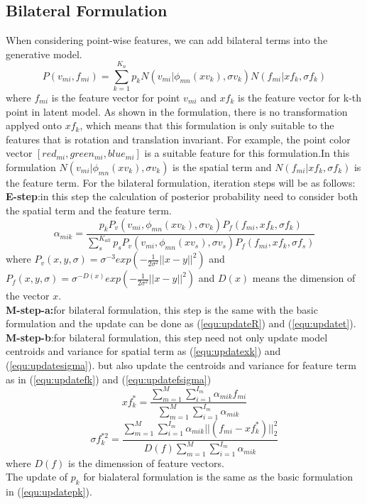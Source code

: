 \subsection{Bilateral Formulation}
When considering point-wise features, we can add bilateral terms into the generative model.
\begin{equation}
P(v_{mi},f_{mi})=\sum^{K_n}_{k=1}p_kN(v_{mi}|\phi_{mn}(xv_k),\sigma v_k)N(f_{mi}|xf_k,\sigma f_k)
\end{equation}
where $f_{mi}$ is the feature vector for point $v_{mi}$ and $xf_k$ is the feature vector for k-th point in latent model. As shown in the formulation, there is no transformation applyed onto $xf_k$, which means that this formulation is only suitable to the features that is rotation and translation invariant. For example, the point color vector $[red_{mi},green_{mi},blue_{mi}]$ is a suitable feature for this formulation.In this formulation $N(v_{mi}|\phi_{mn}(xv_k),\sigma v_k)$ is the spatial term and $N(f_{mi}|xf_k,\sigma f_k)$ is the feature term.
For the bilateral formulation, iteration steps will be as follows:\\
\textbf{E-step}:in this step the calculation of posterior probability need to consider both the spatial term and the feature term.
\begin{equation}
\label{equ:bestep}
\alpha_{mik}=\frac{p_kP_v(v_{mi},\phi_{mn}(xv_k),\sigma v_k)P_f(f_{mi},xf_k,\sigma f_k)}{\sum_s^{K_{all}}p_sP_v(v_{mi},\phi_{mn}(xv_s),\sigma v_s)P_f(f_{mi},xf_k,\sigma f_s)}
\end{equation}
where $P_v(x,y,\sigma)=\sigma^{-3}exp(-\frac{1}{2\sigma^2}||x-y||^2)$ and $P_f(x,y,\sigma)=\sigma^{-D(x)}exp(-\frac{1}{2\sigma^2}||x-y||^2)$ and $D(x)$ means the dimension of the vector $x$.\\
\textbf{M-step-a:}for bilateral formulation, this step is the same with the basic formulation and the update can be done as (\ref{equ:updateR}) and (\ref{equ:updatet}).
\textbf{M-step-b}:for bilateral formulation, this step need not only update model centroids and variance for spatial term as (\ref{equ:updatexk}) and (\ref{equ:updatesigma}).
but also update the centroids and variance for feature term as in (\ref{equ:updatefk}) and (\ref{equ:updatefsigma})\\
\begin{equation}
\label{equ:updatefk}
xf_k^*=\frac{\sum_{m=1}^M\sum_{i=1}^{I_m}\alpha_{mik}f_{mi}}{\sum_{m=1}^M\sum_{i=1}^{I_m}\alpha_{mik}}
\end{equation}
\begin{equation}
\label{equ:updatefsigma}
\sigma f_k^{*2}=\frac{\sum_{m=1}^M\sum_{i=1}^{I_m}\alpha_{mik}||(f_{mi}-xf_k^*)||_2^2}{D(f)\sum_{m=1}^M\sum_{i=1}^{I_m}\alpha_{mik}}
\end{equation}
where $D(f)$ is the dimenssion of feature vectors.\\
The update of $p_k$ for bialateral formulation is the same as the basic formulation in (\ref{equ:updatepk}).
